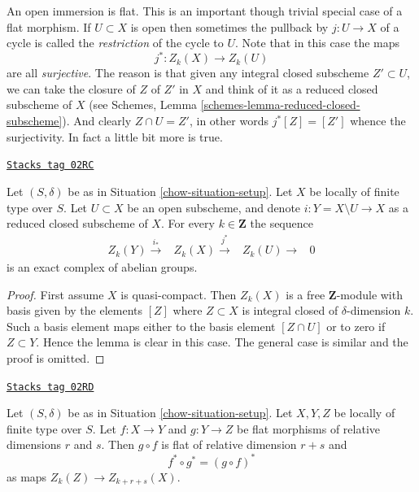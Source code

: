 An open immersion is flat. This is an important though trivial special
case of a flat morphism. If $U \subset X$ is open then sometimes the
pullback by $j : U \to X$ of a cycle is called the {\it restriction} of the
cycle to $U$. Note that in this case the maps
$$
j^* : Z_k(X) \longrightarrow Z_k(U)
$$
are all {\it surjective}. The reason is that given any integral closed
subscheme $Z' \subset U$, we can take the closure of $Z$ of $Z'$ in $X$
and think of it as a reduced closed subscheme of $X$ (see
Schemes, Lemma \ref{schemes-lemma-reduced-closed-subscheme}).
And clearly $Z \cap U = Z'$, in other words
$j^*[Z] = [Z']$ whence the surjectivity. In fact a little bit more
is true.

\begin{lemma}
\label{chow-lemma-exact-sequence-open}
\href{https://stacks.math.columbia.edu/tag/02RC}{\texttt{Stacks tag 02RC}}

Let $(S, \delta)$ be as in Situation \ref{chow-situation-setup}.
Let $X$ be locally of finite type over $S$.
Let $U \subset X$ be an open subscheme, and denote
$i : Y = X \setminus U \to X$ as a reduced closed subscheme of $X$.
For every $k \in \mathbf{Z}$ the sequence
$$
\begin{array}{cccc}Z_k(Y) \overset{i_*}{\longrightarrow} & Z_k(X) \overset{j^*}{\longrightarrow} & Z_k(U) \longrightarrow & 0\end{array}
$$
is an exact complex of abelian groups.
\end{lemma}

\begin{proof}
First assume $X$ is quasi-compact. Then $Z_k(X)$ is a free $\mathbf{Z}$-module
with basis given by the elements $[Z]$ where $Z \subset X$ is integral
closed of $\delta$-dimension $k$. Such a basis element maps
either to the basis element $[Z \cap U]$ or to zero if $Z \subset Y$.
Hence the lemma is clear in this case. The general case is similar
and the proof is omitted.
\end{proof}

\begin{lemma}
\label{chow-lemma-compose-flat-pullback}
\href{https://stacks.math.columbia.edu/tag/02RD}{\texttt{Stacks tag 02RD}}

Let $(S, \delta)$ be as in Situation \ref{chow-situation-setup}.
Let $X, Y, Z$ be locally of finite type over $S$.
Let $f : X \to Y$ and $g : Y \to Z$ be flat morphisms of relative dimensions
$r$ and $s$. Then $g \circ f$ is flat of relative dimension
$r + s$ and
$$
f^* \circ g^* = (g \circ f)^*
$$
as maps $Z_k(Z) \to Z_{k + r + s}(X)$.
\end{lemma}

